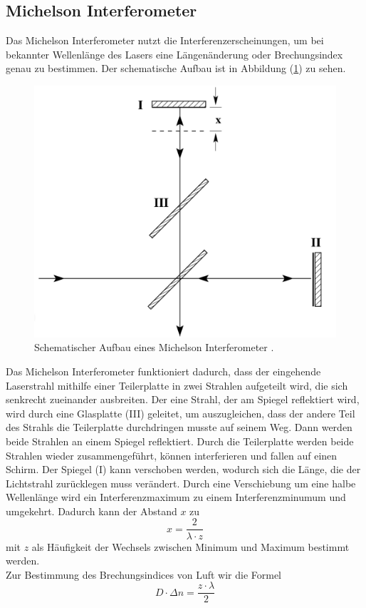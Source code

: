 \subsection{Michelson Interferometer}
Das Michelson Interferometer nutzt die Interferenzerscheinungen, um bei bekannter Wellenlänge des Lasers eine Längenänderung oder Brechungsindex 
genau zu bestimmen. Der schematische Aufbau ist in Abbildung (\ref{fig:Aufbau}) zu sehen. 
\begin{figure}[H]
    \centering
    \includegraphics[width=0.6\linewidth]{"content/Bilder/V401.png"}
    \caption{Schematischer Aufbau eines Michelson Interferometer \cite{anleitungV401}.}
    \label{fig:Aufbau}
\end{figure}
Das Michelson Interferometer funktioniert dadurch, dass der eingehende Laserstrahl mithilfe einer Teilerplatte in zwei Strahlen aufgeteilt wird, die sich senkrecht 
zueinander ausbreiten. Der eine Strahl, der am Spiegel reflektiert wird, wird durch eine Glasplatte (III) geleitet, um auszugleichen, dass der andere Teil des Strahls
die Teilerplatte durchdringen musste auf seinem Weg. Dann werden beide Strahlen an einem Spiegel reflektiert. Durch die Teilerplatte werden beide Strahlen wieder 
zusammengeführt, können interferieren und fallen auf einen Schirm. Der Spiegel (I) kann verschoben werden, wodurch sich die Länge, die der Lichtstrahl zurücklegen 
muss verändert. Durch eine Verschiebung um eine halbe Wellenlänge wird ein Interferenzmaximum zu einem Interferenzminumum und umgekehrt. Dadurch kann 
der Abstand $x$ zu 
\begin{equation}
    x = \frac{2}{\lambda \cdot z}
    \label{eqn:x_Formel}
\end{equation}
mit $z$ als Häufigkeit der Wechsels zwischen Minimum und Maximum bestimmt werden. \\
Zur Bestimmung des Brechungsindices von Luft wir die Formel 
\begin{equation}
    D \cdot \Delta n = \frac{z \cdot \lambda}{2}
    \label{eqn:Delta_n_Bestimmen}
\end{equation}
